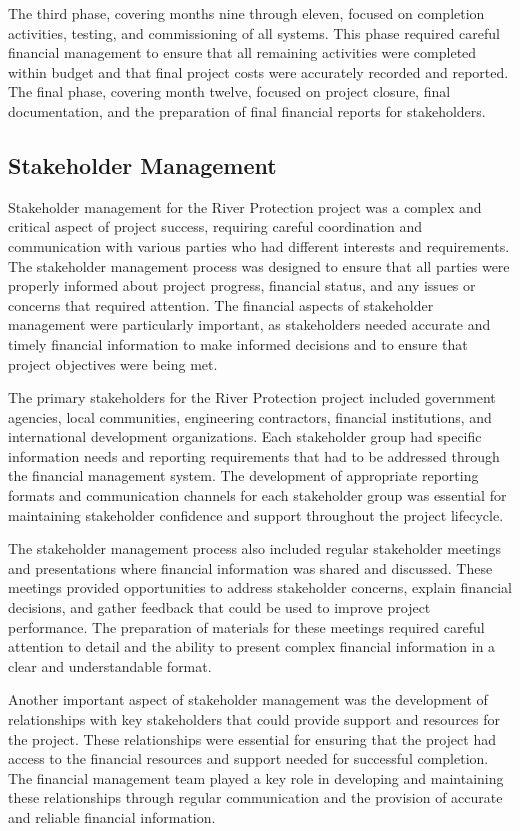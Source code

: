 The third phase, covering months nine through eleven, focused on completion activities, testing, and commissioning of all systems. This phase required careful financial management to ensure that all remaining activities were completed within budget and that final project costs were accurately recorded and reported. The final phase, covering month twelve, focused on project closure, final documentation, and the preparation of final financial reports for stakeholders.

\subsection{Stakeholder Management}
Stakeholder management for the River Protection project was a complex and critical aspect of project success, requiring careful coordination and communication with various parties who had different interests and requirements. The stakeholder management process was designed to ensure that all parties were properly informed about project progress, financial status, and any issues or concerns that required attention. The financial aspects of stakeholder management were particularly important, as stakeholders needed accurate and timely financial information to make informed decisions and to ensure that project objectives were being met.

The primary stakeholders for the River Protection project included government agencies, local communities, engineering contractors, financial institutions, and international development organizations. Each stakeholder group had specific information needs and reporting requirements that had to be addressed through the financial management system. The development of appropriate reporting formats and communication channels for each stakeholder group was essential for maintaining stakeholder confidence and support throughout the project lifecycle.

The stakeholder management process also included regular stakeholder meetings and presentations where financial information was shared and discussed. These meetings provided opportunities to address stakeholder concerns, explain financial decisions, and gather feedback that could be used to improve project performance. The preparation of materials for these meetings required careful attention to detail and the ability to present complex financial information in a clear and understandable format.

Another important aspect of stakeholder management was the development of relationships with key stakeholders that could provide support and resources for the project. These relationships were essential for ensuring that the project had access to the financial resources and support needed for successful completion. The financial management team played a key role in developing and maintaining these relationships through regular communication and the provision of accurate and reliable financial information.

